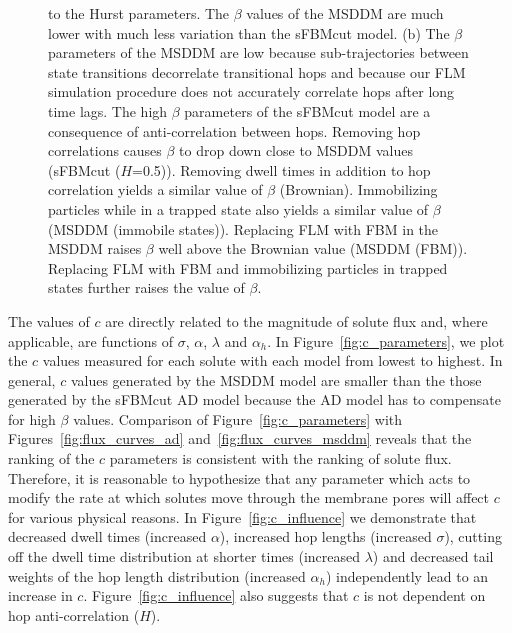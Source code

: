 \documentclass[12pt]{article}
\begin{document}
\begin{figure}
{  to the Hurst parameters. The $\beta$ values of the MSDDM are much lower with much less
  variation than the sFBMcut model. (b) The $\beta$ parameters of the MSDDM are low because
  sub-trajectories between state transitions decorrelate transitional hops and because
  our FLM simulation procedure does not accurately correlate hops after long time lags. 
  The high $\beta$ parameters of the sFBMcut model are a consequence of anti-correlation
  between hops. Removing hop correlations causes $\beta$ to drop down close to MSDDM
  values (sFBMcut ($H$=0.5)). Removing dwell times in addition to hop correlation
  yields a similar value of $\beta$ (Brownian). Immobilizing particles while in a trapped state
  also yields a similar value of $\beta$ (MSDDM (immobile states)). Replacing FLM with
  FBM in the MSDDM raises $\beta$ well above the Brownian value (MSDDM (FBM)). Replacing FLM with FBM and
  immobilizing particles in trapped states further raises the value of $\beta$.}\label{fig:beta}
  \end{figure}
  
  The values of $c$ are directly related to the magnitude of solute flux and, where
  applicable, are functions of $\sigma$, $\alpha$, $\lambda$ and $\alpha_h$. 
  In Figure~\ref{fig:c_parameters}, we plot the $c$ values measured
  for each solute with each model from lowest to highest. In general, $c$ values generated
  by the MSDDM model are smaller than the those generated by the sFBMcut AD model 
  because the AD model has to compensate for high $\beta$ values. Comparison 
  of Figure~\ref{fig:c_parameters} with Figures~\ref{fig:flux_curves_ad} 
  and~\ref{fig:flux_curves_msddm} reveals that the ranking of the $c$ parameters is
  consistent with the ranking of solute flux. Therefore, it is reasonable to hypothesize
  that any parameter which acts to modify the rate at which solutes move through the
  membrane pores will affect $c$ for various physical reasons. In 
  Figure~\ref{fig:c_influence} we demonstrate that decreased dwell times
  (increased $\alpha$), increased hop lengths (increased $\sigma$), cutting off the
  dwell time distribution at shorter times (increased $\lambda$) and decreased tail 
  weights of the hop length distribution (increased $\alpha_h$) independently lead to
  an increase in $c$. Figure~\ref{fig:c_influence} also suggests that $c$ is not dependent on hop
  anti-correlation ($H$).

  
\end{document}
